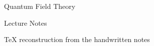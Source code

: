 \documentclass[10pt,oneside]{book}
\begin{document}
\frontmatter
\begin{titlepage}
\centering
{\Huge Quantum Field Theory\par}
\vspace{1em}
{\Large Lecture Notes\par}
\vfill
{\large TeX reconstruction from the handwritten notes\par}
\end{titlepage}

\tableofcontents

\mainmatter




\end{document}
